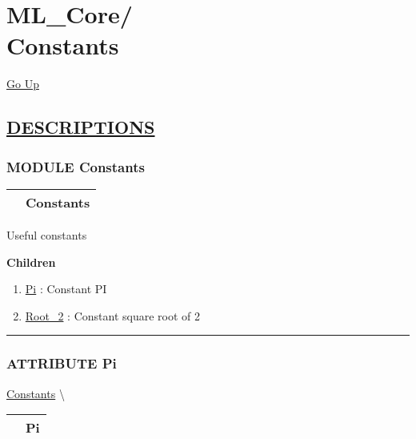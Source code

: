 \chapter*{\color{headfile}
{\large ML\_Core\slash\hspace{0pt}}
 \\
Constants
}
\hypertarget{ecldoc:toc:ML_Core.Constants}{}
\hyperlink{ecldoc:toc:root/ML_Core}{Go Up}


\section*{\underline{\textsf{DESCRIPTIONS}}}
\subsection*{\textsf{\colorbox{headtoc}{\color{white} MODULE}
Constants}}

\hypertarget{ecldoc:ML_Core.Constants}{}

{\renewcommand{\arraystretch}{1.5}
\begin{tabularx}{\textwidth}{|>{\raggedright\arraybackslash}l|X|}
\hline
\hspace{0pt}\mytexttt{\color{red} } & \textbf{Constants} \\
\hline
\end{tabularx}
}

\par
Useful constants


\textbf{Children}
\begin{enumerate}
\item \hyperlink{ecldoc:ml_core.constants.pi}{Pi}
: Constant PI
\item \hyperlink{ecldoc:ml_core.constants.root_2}{Root\_2}
: Constant square root of 2
\end{enumerate}

\rule{\linewidth}{0.5pt}

\subsection*{\textsf{\colorbox{headtoc}{\color{white} ATTRIBUTE}
Pi}}

\hypertarget{ecldoc:ml_core.constants.pi}{}
\hspace{0pt} \hyperlink{ecldoc:ML_Core.Constants}{Constants} \textbackslash 

{\renewcommand{\arraystretch}{1.5}
\begin{tabularx}{\textwidth}{|>{\raggedright\arraybackslash}l|X|}
\hline
\hspace{0pt}\mytexttt{\color{red} } & \textbf{Pi} \\
\hline
\end{tabularx}
}

